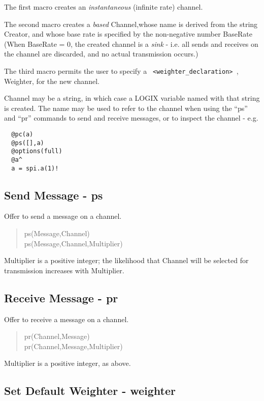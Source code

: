 \noindent
The first macro creates an {\em instantaneous}
(infinite rate) channel.

\noindent
The second macro creates a {\em based} Channel,whose
name is derived from the string Creator, and whose base rate is specified by
the non-negative number BaseRate (When BaseRate = 0, the created
channel is a {\em sink} -
i.e. all sends and receives on the channel are discarded, and no actual
transmission occurs.)

\noindent
The third macro permits the user to specify a
\verb+ <weighter_declaration> +, Weighter, for the new channel.

\noindent
Channel may be a string, in which case a LOGIX variable named with that
string is created.  The name may be used to refer to the channel
when using the ``ps'' and ``pr'' commands to send and receive messages,
or to inspect the channel - e.g.

\begin{verbatim}
  @pc(a)
  @ps([],a)
  @options(full)
  @a^
  a = spi.a(1)!
\end{verbatim}

\subsection{Send Message - ps}

Offer to send a message on a channel.

\begin{verse}
ps(Message,Channel) \\
ps(Message,Channel,Multiplier)
\end{verse}

\noindent
Multiplier is a positive integer;
the likelihood that Channel will be selected for transmission
increases with Multiplier.

\subsection{Receive Message - pr}

Offer to receive a message on a channel.

\begin{verse}
pr(Channel,Message) \\
pr(Channel,Message,Multiplier)
\end{verse}

\noindent
Multiplier is a positive integer, as above.

\subsection{Set Default Weighter - weighter}
\label{weighter macro}


